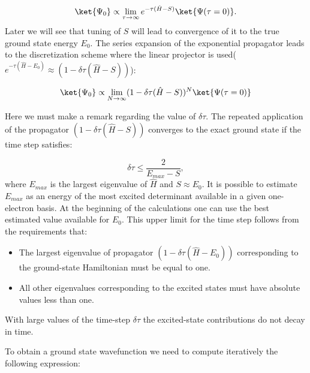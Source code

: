 \documentclass[twoside,english]{uiofysmaster}
\begin{document}
\begin{equation}\label{SEsolutionpropagator111}
\ket{\Psi_0} \propto \lim_{\tau \rightarrow \infty} e^{-\tau (\hat{H}-S)}\ket{\Psi(\tau = 0)}.
\end{equation}
Later we will see that tuning of $S$ will lead to convergence of it to
the true ground state energy $E_0$. The series expansion of the
exponential propagator leads to the discretization scheme where the
linear projector is used($e^{-\tau (\hat{H}-E_0)} \approx (1 - \delta
\tau (\hat{H}-S))$):

\begin{equation}\label{SEsolutionpropagator1111}
\ket{\Psi_0} \propto \lim_{N \rightarrow \infty} (1 - \delta \tau (\hat{H}-S))^N \ket{\Psi(\tau = 0)}
\end{equation}

Here we must make a remark regarding the value of $\delta \tau$. The repeated application of the propagator $(1 - \delta \tau (\hat{H}-S))$ converges to the exact ground state if the time step satisfies:

\begin{equation}
\delta \tau \leq \frac{2}{E_{max} - S},
\end{equation}
where $E_{max}$ is the largest eigenvalue of $\hat{H}$ and $S \approx E_0$. It is possible to estimate $E_{max}$ as an energy of the most excited determinant available in a given one-electron basis. At the beginning of the calculations one can use the best estimated value available for $E_0$.
This upper limit for the time step follows from the requirements that:
\begin{itemize}
	\item The largest eigenvalue of propagator $(1 - \delta \tau (\hat{H}-E_0))$ corresponding to the ground-state Hamiltonian must be equal to one.
	\item All other eigenvalues corresponding to the excited states must have absolute values less than one.
\end{itemize}
With large values of the time-step $\delta \tau$ the excited-state contributions do not decay in time.

To obtain a ground state wavefunction we need to compute iteratively the following expression:
\end{document}
